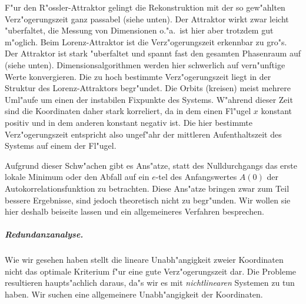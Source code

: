 F"ur den R"ossler-Attraktor gelingt die Rekonstruktion mit der so gew"ahlten
Verz"ogerungszeit ganz passabel (siehe  unten). Der Attraktor wirkt zwar
leicht "uberfaltet, die Messung von Dimensionen o."a.\ ist hier aber trotzdem gut
m"oglich. Beim Lorenz-Attraktor ist die Verz"ogerungszeit erkennbar zu gro"s. Der
Attraktor ist stark "uberfaltet und spannt fast den gesamten Phasenraum auf (siehe
 unten). Dimensionsalgorithmen werden hier schwerlich auf vern"unftige
Werte konvergieren. Die zu hoch bestimmte Verz"ogerungszeit liegt in der Struktur des
Lorenz-Attraktors begr"undet. Die Orbits \naja(kreisen) meist mehrere Uml"aufe um einen
der instabilen Fixpunkte des Systems. W"ahrend dieser Zeit sind die Koordinaten daher
stark korreliert, da in dem einen Fl"ugel $x$ konstant positiv und in dem anderen konstant
negativ ist. Die hier bestimmte Verz"ogerungszeit entspricht also ungef"ahr der mittleren
Aufenthaltszeit des Systems auf einem der Fl"ugel.

Aufgrund dieser Schw"achen gibt es Ans"atze, statt des Nulldurchgangs das erste lokale
Minimum oder den Abfall auf ein $e$-tel des Anfangswertes $A(0)$ der Autokorrelationsfunktion zu betrachten. Diese
Ans"atze bringen zwar zum Teil bessere Ergebnisse, sind jedoch theoretisch nicht zu
begr"unden. Wir wollen sie hier deshalb beiseite lassen und ein allgemeineres Verfahren
besprechen.

\subparagraph{Redundanzanalyse.} \label{chapredundancy} Wie wir gesehen haben stellt die lineare
Un\-ab\-h"an\-gig\-keit zweier Koordinaten nicht das optimale Kriterium f"ur eine gute
Verz"ogerungszeit dar. Die Probleme resultieren haupts"achlich daraus, da"s wir es mit
\emph{nichtlinearen} Systemen zu tun haben. Wir suchen eine allgemeinere Unabh"angigkeit
der Koordinaten.


\comment{Sei $X$ eine beliebige Zufallsvariable und $\Prob_X(i)$ die Wahrscheinlichkeit
  bei einer Messung von $X$ einen Wert im Intervall $[x_i,x_{i+1}[$ zu erhalten. Dann
  betr"agt die mittlere Information einer Messung von $X$}

